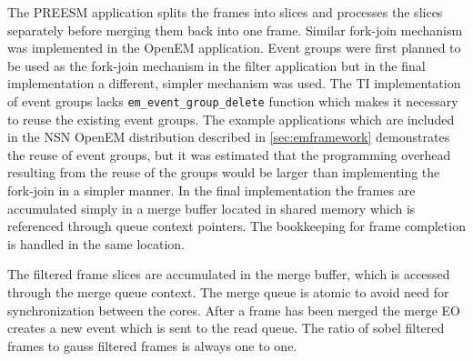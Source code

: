 The PREESM application splits the frames into slices and processes the slices separately before merging them back into one frame. Similar fork-join mechanism was implemented in the OpenEM application. Event groups were first planned to be used as the fork-join mechanism in the filter application but in the final implementation a different, simpler mechanism was used. The TI implementation of event groups lacks \texttt{em\_event\_group\_delete} function which makes it necessary to reuse the existing event groups. The example applications which are included in the NSN OpenEM distribution described in \ref{sec:emframework} demonstrates the reuse of event groups, but it was estimated that the programming overhead resulting from the reuse of the groups would be larger than implementing the fork-join in a simpler manner. In the final implementation the frames are accumulated simply in a merge buffer located in shared memory which is referenced through queue context pointers. The bookkeeping for frame completion is handled in the same location.

The filtered frame slices are accumulated in the merge buffer, which is accessed through the merge queue context. The merge queue is atomic to avoid need for synchronization between the cores. After a frame has been merged the merge EO creates a new event which is sent to the read queue. The ratio of sobel filtered frames to gauss filtered frames is always one to one.
